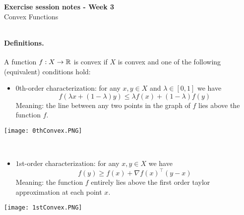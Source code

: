 \documentclass[answers]{exam}
\begin{document}
	$ $
	\begin{center}
		\huge \textbf{Exercise session notes - Week 3}  \\ \vspace*{3mm}
        \Large{Convex Functions}
	\end{center}
	$ $\\
    
    \paragraph*{Definitions.} A function $f:X\to \mathbb{R}$ is convex if $X$ is convex and one of the following (equivalent) conditions hold:\vspace{5mm} \\ 
    \begin{minipage}{12cm}
        \begin{itemize}
            \item $0$th-order characterization: for any $x,y\in X$ and $\lambda\in [0,1]$ we have 
            $$ f(\lambda x + (1-\lambda)y)\leq \lambda f(x) + (1-\lambda)f(y) $$
            Meaning: the line between any two points in the graph of $f$ lies above the function $f$. 
        \end{itemize} 
    \end{minipage}
    \hspace*{3mm}
    \begin{minipage}{6cm}    
        \texttt{[image: 0thConvex.PNG]}
    \end{minipage} \vspace*{5mm} \\ 
    \begin{minipage}{12cm}
        \begin{itemize}
            \item $1$st-order characterization: for any $x,y\in X$ we have 
            $$ f(y)\geq f(x) + \nabla f(x)^\top(y-x) $$
            Meaning: the function $f$ entirely lies above the first order taylor approximation at each point $x$.
        \end{itemize} 
    \end{minipage}
    \hspace*{3mm}
    \begin{minipage}{6cm}    
        \texttt{[image: 1stConvex.PNG]}
    \end{minipage} \vspace*{5mm} \\ 
\end{document}
